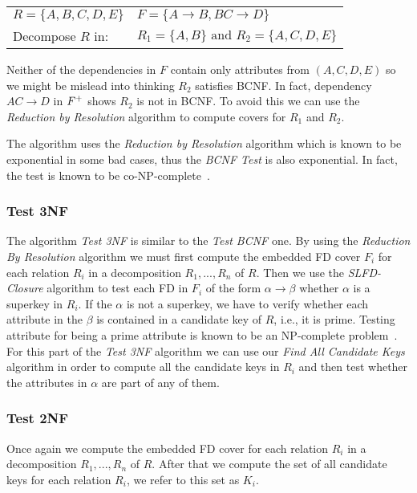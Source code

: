 \begin{center}
\begin{tabular}[h]{l l}
  $R = \{A, B, C, D, E\}$ & $F = \{A \rightarrow B, BC \rightarrow D\}$ \\
  Decompose $R$ in:  & $R_1 = \{A, B\} \mbox{ and } R_2 = \{A, C, D, E\}$ \\ 
\end{tabular}
\end{center}

Neither of the dependencies in $F$ contain only attributes from
$(A,C,D,E)$ so we might be mislead into thinking $R_2$ satisfies BCNF. In fact, 
dependency $AC \rightarrow D$ in $F\sp{+}$ shows $R_2$ is not in BCNF. To avoid this we can
use the \textit{Reduction by Resolution} algorithm to compute covers for $R_1$ and $R_2$. 

The algorithm uses the \textit{Reduction by Resolution} algorithm which is known to be exponential
in some bad cases, thus the \textit{BCNF Test} is also exponential. In fact, the test is known to 
be co-NP-complete~\cite{p4}.

\subsubsection{Test 3NF}
The algorithm \textit{Test 3NF} is similar to the \textit{Test BCNF} one. 
By using the \textit{Reduction By Resolution} algorithm
we must first compute the
embedded FD cover $F_i$ for each relation $R_i$ in a decomposition $R_1,...,R_n$ of $R$. Then we use 
the \textit{SLFD-Closure} algorithm to test each FD in $F_i$ of the form $\alpha \rightarrow \beta$ 
whether $\alpha$ is a superkey in $R_i$. 
If the $\alpha$ is not a superkey, we have to verify whether each attribute in the $\beta$ 
is contained in a candidate key of $R$, i.e., it is prime. Testing attribute for being a prime
attribute is known to be an NP-complete problem~\cite{p3}. For this part of the \textit{Test 3NF} algorithm
we can use our \textit{Find All Candidate Keys} algorithm in order
to compute all the candidate keys in $R_i$ and then test whether the attributes in $\alpha$ are part of any 
of them.

\subsubsection{Test 2NF}
Once again we compute the
embedded FD cover for each relation $R_i$ in a decomposition $R_1,...,R_n$ of $R$. After that 
we compute the set of all candidate keys for each relation $R_i$, we refer to this set as $K_i$.
 
